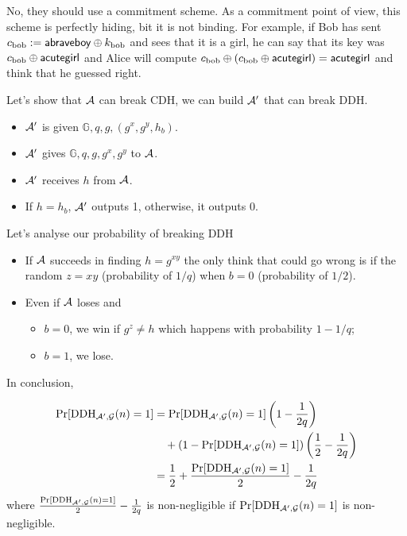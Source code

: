 \nosolution

\begin{solution}
  No, they should use a commitment scheme.
  As a commitment point of view, this scheme is perfectly hiding, bit it is not binding.
  For example, if Bob has sent $c_{\text{bob}} := \mathsf{abraveboy} \oplus k_{\text{bob}}$ and sees that it is a girl,
  he can say that its key was $c_{\text{bob}} \oplus \mathsf{acutegirl}$ and Alice will
  compute $c_{\text{bob}} \oplus (c_{\text{bob}} \oplus \mathsf{acutegirl}) = \mathsf{acutegirl}$ and think that he guessed right.
\end{solution}

\begin{solution}
  Let's show that $\mathcal{A}$ can break CDH, we can build $\mathcal{A}'$ that can break DDH.
  \begin{itemize}
    \item $\mathcal{A}'$ is given $\mathbb{G}, q, g, (g^x, g^y, h_b)$.
    \item $\mathcal{A}'$ gives $\mathbb{G}, q, g, g^x, g^y$ to $\mathcal{A}$.
    \item $\mathcal{A}'$ receives $h$ from $\mathcal{A}$.
    \item If $h = h_b$, $\mathcal{A}'$ outputs 1, otherwise, it outputs 0.
  \end{itemize}
  Let's analyse our probability of breaking DDH
  \begin{itemize}
    \item
      If $\mathcal{A}$ succeeds in finding $h = g^{xy}$ the only think that could go wrong
      is if the random $z = xy$ (probability of $1/q$) when $b = 0$ (probability of $1/2$).
    \item
      Even if $\mathcal{A}$ loses and
      \begin{itemize}
        \item $b = 0$, we win if $g^z \neq h$ which happens with probability $1-1/q$;
        \item $b = 1$, we lose.
      \end{itemize}
  \end{itemize}
  In conclusion,

  \begin{align*}
    \Pr[\operatorname{DDH}_{\mathcal{A}',\mathcal{G}}(n) = 1]
    & = \Pr[\operatorname{DDH}_{\mathcal{A}',\mathcal{G}}(n) = 1]\left(1 - \frac{1}{2q}\right)\\
    & \quad + (1 - \Pr[\operatorname{DDH}_{\mathcal{A}',\mathcal{G}}(n) = 1])\left(\frac{1}{2}-\frac{1}{2q}\right)\\
    & = \frac{1}{2} + \frac{\Pr[\operatorname{DDH}_{\mathcal{A}',\mathcal{G}}(n) = 1]}{2} - \frac{1}{2q}
  \end{align*}
  where $\frac{\Pr[\operatorname{DDH}_{\mathcal{A}',\mathcal{G}}(n) = 1]}{2} - \frac{1}{2q}$ is non-negligible if $\Pr[\operatorname{DDH}_{\mathcal{A}',\mathcal{G}}(n) = 1]$
  is non-negligible.
\end{solution}
